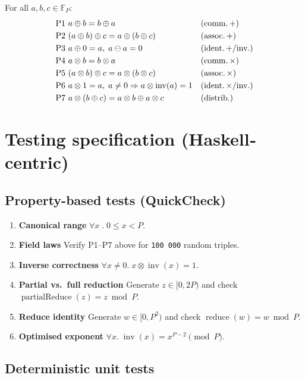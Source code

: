 \documentclass{article}
\begin{document}
For all $a,b,c\in\mathbb{F}_{P}$:
\[
\begin{aligned}
&\text{P1 } a\oplus b = b\oplus a
&&\text{(comm.\,+)}\\
&\text{P2 } (a\oplus b)\oplus c = a\oplus(b\oplus c)
&&\text{(assoc.\,+)}\\
&\text{P3 } a\oplus0 = a,\; a\ominus a = 0
&&\text{(ident.\,+/inv.)}\\
&\text{P4 } a\otimes b = b\otimes a
&&\text{(comm.\,$\times$)}\\
&\text{P5 } (a\otimes b)\otimes c = a\otimes(b\otimes c)
&&\text{(assoc.\,$\times$)}\\
&\text{P6 } a\otimes1 = a,\; a\neq0\Rightarrow a\otimes\operatorname{inv}(a)=1
&&\text{(ident.\,$\times$/inv.)}\\
&\text{P7 } a\otimes(b\oplus c)=a\otimes b\oplus a\otimes c
&&\text{(distrib.)}
\end{aligned}
\]

\section{Testing specification (Haskell‐centric)}

\subsection{Property-based tests (QuickCheck)}

\begin{enumerate}[label=\textbf{Q\arabic*}.]
\item \textbf{Canonical range}  
      \(\forall x\;.\;0\le x < P\).
\item \textbf{Field laws}  
      Verify P1–P7 above for \texttt{100\,000} random triples.
\item \textbf{Inverse correctness}  
      \(\forall x\neq0.\;x\otimes\operatorname{inv}(x)=1\).
\item \textbf{Partial vs.\ full reduction}  
      Generate $z\in[0,2P)$ and check  
      \(\operatorname{partialReduce}(z)=z\bmod P\).
\item \textbf{Reduce identity}  
      Generate $w\in[0,P^{2})$ and check  
      \(\operatorname{reduce}(w)=w\bmod P\).
\item \textbf{Optimised exponent}  
      \(\forall x.\;\operatorname{inv}(x)=x^{P-2}\pmod P\).
\end{enumerate}

\subsection{Deterministic unit tests}
\end{document}
